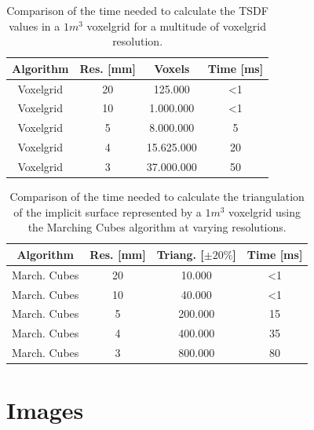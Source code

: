 \documentclass[10pt,twocolumn,letterpaper]{article}
\begin{document}
\begin{table}[h!]
  \begin{center}
    \begin{tabular}{c|c|c|c}
      \textbf{Algorithm} & \textbf{Res. [mm]} & \textbf{Voxels} & \textbf{Time [ms]}\\
      \hline
      Voxelgrid & 20 & 125.000 & \textless 1\\
      Voxelgrid & 10 & 1.000.000 & \textless 1\\
      Voxelgrid & 5 & 8.000.000 & 5\\
      Voxelgrid & 4 & 15.625.000 & 20\\
      Voxelgrid & 3 & 37.000.000 & 50\\
    \end{tabular}
     \caption{Comparison of the time needed to calculate the TSDF values in a $1m^3$ voxelgrid for a multitude of voxelgrid resolution.}
     \label{tab:voxelgrid}
  \end{center}
\end{table}

\begin{table}[h!]
  \begin{center}
    \begin{tabular}{c|c|c|c}
      \textbf{Algorithm} & \textbf{Res. [mm]} & \textbf{Triang. [$\pm 20\%$]}  & \textbf{Time [ms]}\\
      \hline
      March. Cubes & 20  & 10.000   & \textless 1\\
      March. Cubes & 10  & 40.000  & \textless 1\\
      March. Cubes & 5 & 200.000   & 15\\
      March. Cubes & 4 & 400.000   & 35\\
      March. Cubes & 3 & 800.000    & 80\\
    \end{tabular}
     \caption{Comparison of the time needed to calculate the triangulation of the implicit surface represented by a $1m^3$ voxelgrid using the Marching Cubes algorithm at varying resolutions.}
     \label{tab:marching-cubes}
  \end{center}
\end{table}

\clearpage
\section{Images}
\label{sec:images}
\end{document}
